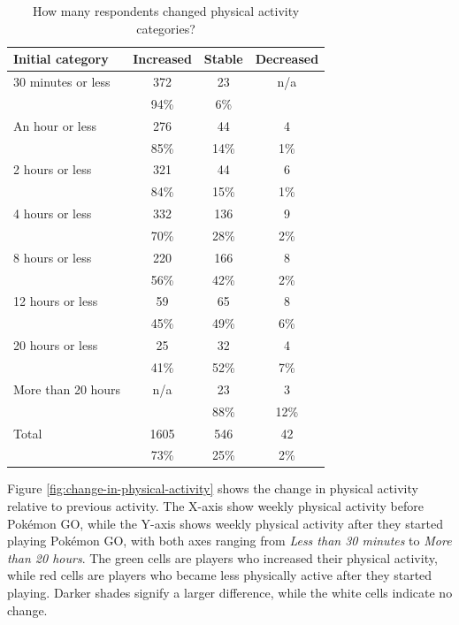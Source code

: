 \begin{table}[h]
	\centering
	\caption{How many respondents changed physical activity categories?}
	\label{tbl:physical-activity-changed-category}
	\begin{tabular}{|l|c|c|c|}
		\hline
		\textbf{Initial category} & \textbf{Increased} & \textbf{Stable} & \textbf{Decreased}\\
		\hline\hline
		30 minutes or less	& 372	& 23	& n/a\\
		& 94\%	& 6\%	& \\\hline
		An hour or less		& 276	& 44	& 4\\
		& 85\%	& 14\%	& 1\%\\\hline
		2 hours or less		& 321	& 44	& 6\\
		& 84\%	& 15\%	& 1\%\\\hline
		4 hours or less		& 332	& 136	& 9\\
		& 70\%	& 28\%	& 2\%\\\hline
		8 hours or less		& 220	& 166	& 8\\
		& 56\%	& 42\%	& 2\%\\\hline
		12 hours or less	& 59	& 65	& 8\\
		& 45\%	& 49\%	& 6\%\\\hline
		20 hours or less	& 25	& 32	& 4\\
		& 41\%	& 52\%	& 7\%\\\hline
		More than 20 hours	& n/a		& 23	& 3\\
		&	& 88\%	& 12\%\\\hline
		\hline
		Total				& 1605	& 546	& 42\\
		& 73\%	& 25\%	& 2\%\\\hline
	\end{tabular}
\end{table}

Figure \ref{fig:change-in-physical-activity} shows the change in physical activity relative to previous activity. The X-axis show weekly physical activity before Pokémon GO, while the Y-axis shows weekly physical activity after they started playing Pokémon GO, with both axes ranging from \emph{Less than 30 minutes} to \emph{More than 20 hours}. The green cells are players who increased their physical activity, while red cells are players who became less physically active after they started playing. Darker shades signify a larger difference, while the white cells indicate no change. 

